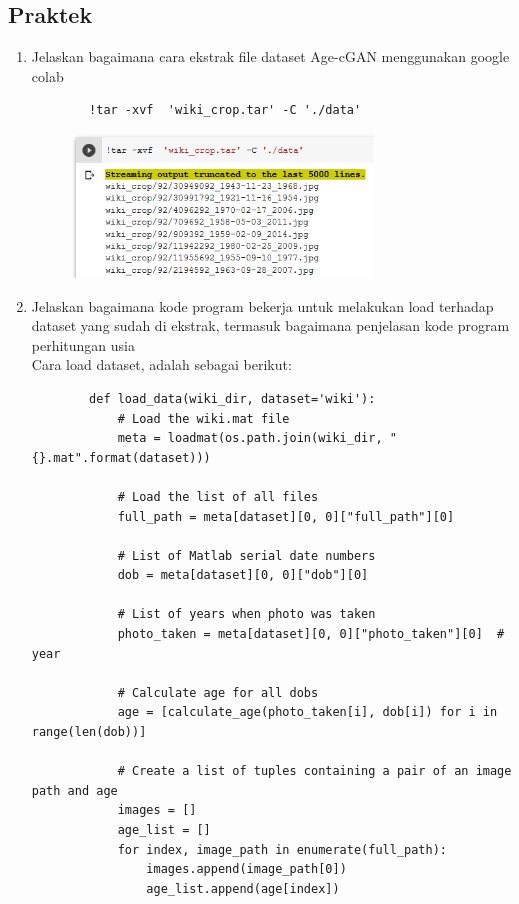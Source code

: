 \subsection{Praktek}
\begin{enumerate}
	\item Jelaskan bagaimana cara ekstrak file dataset Age-cGAN menggunakan google colab
    \begin{lstlisting}
        !tar -xvf  'wiki_crop.tar' -C './data'
    \end{lstlisting}
    \begin{figure}[H]
		\includegraphics[width=8cm]{figures/1174006/chapter9/praktek/1.png}
		\centering
	\end{figure}
    \item Jelaskan bagaimana kode program bekerja untuk melakukan load terhadap dataset yang sudah di ekstrak, termasuk bagaimana penjelasan kode program perhitungan usia\\
    Cara load dataset, adalah sebagai berikut:
    \begin{lstlisting}
        def load_data(wiki_dir, dataset='wiki'):
            # Load the wiki.mat file
            meta = loadmat(os.path.join(wiki_dir, "{}.mat".format(dataset)))

            # Load the list of all files
            full_path = meta[dataset][0, 0]["full_path"][0]

            # List of Matlab serial date numbers
            dob = meta[dataset][0, 0]["dob"][0]

            # List of years when photo was taken
            photo_taken = meta[dataset][0, 0]["photo_taken"][0]  # year

            # Calculate age for all dobs
            age = [calculate_age(photo_taken[i], dob[i]) for i in range(len(dob))]

            # Create a list of tuples containing a pair of an image path and age
            images = []
            age_list = []
            for index, image_path in enumerate(full_path):
                images.append(image_path[0])
                age_list.append(age[index])


\end{lstlisting}
\end{enumerate}
